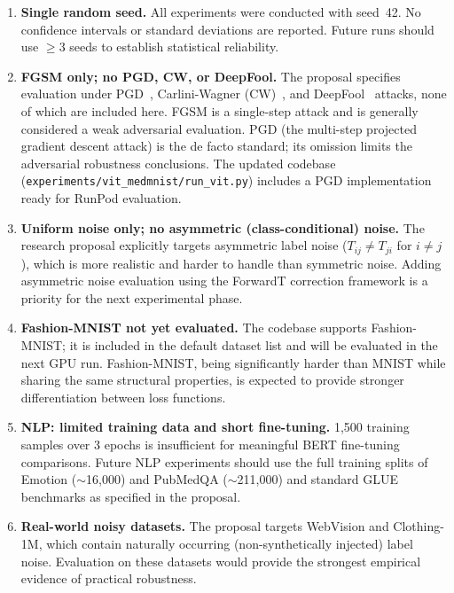\begin{enumerate}[leftmargin=*,itemsep=4pt]
  \item \textbf{Single random seed.}
        All experiments were conducted with seed~42.
        No confidence intervals or standard deviations are reported.
        Future runs should use $\geq 3$ seeds to establish statistical reliability.

  \item \textbf{FGSM only; no PGD, CW, or DeepFool.}
        The proposal specifies evaluation under PGD~\citep{madry2018},
        Carlini-Wagner (CW)~\citep{carlini2017}, and DeepFool~\citep{moosavi2016}
        attacks, none of which are included here.
        FGSM is a single-step attack and is generally considered a weak
        adversarial evaluation.
        PGD (the multi-step projected gradient descent attack) is the
        de facto standard; its omission limits the adversarial robustness
        conclusions.
        The updated codebase (\texttt{experiments/vit\_medmnist/run\_vit.py})
        includes a PGD implementation ready for RunPod evaluation.

  \item \textbf{Uniform noise only; no asymmetric (class-conditional) noise.}
        The research proposal explicitly targets asymmetric label noise
        ($T_{ij} \neq T_{ji}$ for $i \neq j$), which is more realistic and
        harder to handle than symmetric noise.
        Adding asymmetric noise evaluation using the ForwardT correction
        framework is a priority for the next experimental phase.

  \item \textbf{Fashion-MNIST not yet evaluated.}
        The codebase supports Fashion-MNIST; it is included in the default
        dataset list and will be evaluated in the next GPU run.
        Fashion-MNIST, being significantly harder than MNIST while sharing
        the same structural properties, is expected to provide stronger
        differentiation between loss functions.

  \item \textbf{NLP: limited training data and short fine-tuning.}
        1{,}500 training samples over 3 epochs is insufficient for
        meaningful BERT fine-tuning comparisons.
        Future NLP experiments should use the full training splits of
        Emotion ($\sim$16{,}000) and PubMedQA ($\sim$211{,}000) and
        standard GLUE benchmarks as specified in the proposal.

  \item \textbf{Real-world noisy datasets.}
        The proposal targets WebVision and Clothing-1M, which contain
        naturally occurring (non-synthetically injected) label noise.
        Evaluation on these datasets would provide the strongest empirical
        evidence of practical robustness.
\end{enumerate}

